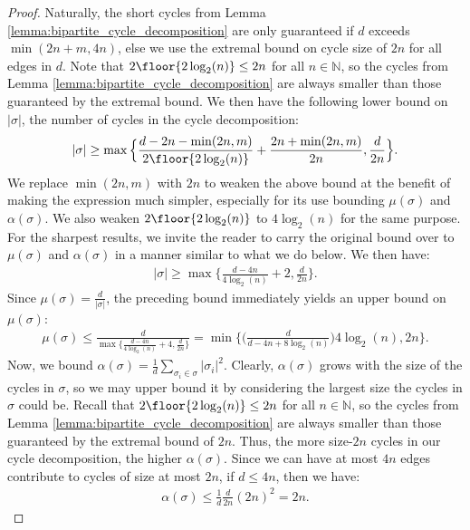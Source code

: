 \documentclass[10pt]{article}
\begin{document}
\begin{ReviewVerbatim}
\begin{proof}
			Naturally, the short cycles from Lemma \ref{lemma:bipartite_cycle_decomposition} are only guaranteed if $d$ exceeds $\min(2n + m, 4n)$, else we use the extremal bound on cycle size of $2n$ for all edges in $d$. Note that $2\floor{2 \log_2(n)} \leq 2n$ for all $n \in \mathbb{N}$, so the cycles from Lemma \ref{lemma:bipartite_cycle_decomposition} are always smaller than those guaranteed by the extremal bound. We then have the following lower bound on $|\sigma|$, the number of cycles in the cycle decomposition:
			\begin{align*}
			|\sigma| \geq \max \Big\{\frac{d - 2n - \min(2n, m)}{2\floor{2 \log_2(n)}} + \frac{2n + \min(2n, m)}{2n}, \frac{d}{2n}\Big\}.
			\end{align*}
			We replace $\min(2n,m)$ with $2n$ to weaken the above bound at the benefit of making the expression much simpler, especially for its use bounding $\mu(\sigma)$ and $\alpha(\sigma)$. We also weaken $2\floor{2 \log_2(n)}$ to $4 \log_2(n)$ for the same purpose. For the sharpest results, we invite the reader to carry the original bound over to $\mu(\sigma)$ and $\alpha(\sigma)$ in a manner similar to what we do below. We then have:
			\begin{align*}
			|\sigma| \geq \max \Big\{\frac{d - 4n}{4\log_2 (n)} + 2, \frac{d}{2n}\Big\}.
			\end{align*}
			Since $\mu(\sigma) = \frac{d}{|\sigma|}$, the preceding bound immediately yields an upper bound on $\mu(\sigma)$:
			\begin{align*}
			\mu(\sigma) \leq \frac{d}{\max \Big\{\frac{d - 4n}{4\log_2(n)} + 4, \frac{d}{2n}\Big\}} = \min \Big\{\Big(\frac{d}{d - 4n + 8\log_2 (n)}\Big)4\log_2 (n), 2n\Big\}.
			\end{align*}
			Now, we bound $\alpha(\sigma) = \frac{1}{d}\sum_{\sigma_i \in \sigma} |\sigma_i|^2$. Clearly, $\alpha(\sigma)$ grows with the size of the cycles in $\sigma$, so we may upper bound it by considering the largest size the cycles in $\sigma$ could be. Recall that $2\floor{2 \log_2(n)} \leq 2n$ for all $n \in \mathbb{N}$, so the cycles from Lemma \ref{lemma:bipartite_cycle_decomposition} are always smaller than those guaranteed by the extremal bound of $2n$. Thus, the more size-$2n$ cycles in our cycle decomposition, the higher $\alpha(\sigma)$. Since we can have at most $4n$ edges contribute to cycles of size at most $2n$, if $d \leq 4n$, then we have:
			\begin{align*}
			\alpha(\sigma) \leq \frac{1}{d} \frac{d}{2n} (2n)^2 = 2n.
			\end{align*}

\end{proof}
\end{ReviewVerbatim}
\end{document}

